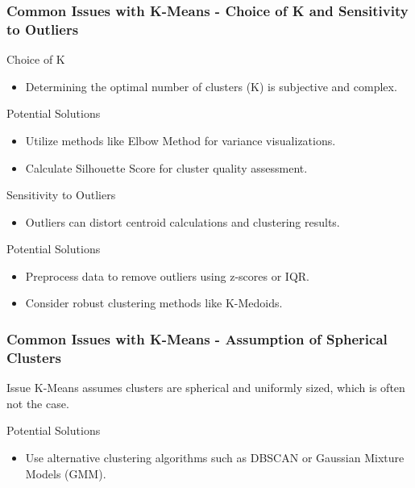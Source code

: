 \documentclass[aspectratio=169]{beamer}
\begin{document}
\begin{frame}[fragile]
    \frametitle{Common Issues with K-Means - Choice of K and Sensitivity to Outliers}
    \begin{block}{Choice of K}
        \begin{itemize}
            \item Determining the optimal number of clusters (K) is subjective and complex.
        \end{itemize}
        \begin{block}{Potential Solutions}
            \begin{itemize}
                \item Utilize methods like Elbow Method for variance visualizations.
                \item Calculate Silhouette Score for cluster quality assessment.
            \end{itemize}
        \end{block}
    \end{block}
    
    \begin{block}{Sensitivity to Outliers}
        \begin{itemize}
            \item Outliers can distort centroid calculations and clustering results.
        \end{itemize}
        \begin{block}{Potential Solutions}
            \begin{itemize}
                \item Preprocess data to remove outliers using z-scores or IQR.
                \item Consider robust clustering methods like K-Medoids.
            \end{itemize}
        \end{block}
    \end{block}
\end{frame}

\begin{frame}[fragile]
    \frametitle{Common Issues with K-Means - Assumption of Spherical Clusters}
    \begin{block}{Issue}
        K-Means assumes clusters are spherical and uniformly sized, which is often not the case.
    \end{block}
    \begin{block}{Potential Solutions}
        \begin{itemize}
            \item Use alternative clustering algorithms such as DBSCAN or Gaussian Mixture Models (GMM).
        \end{itemize}
    \end{block}
\end{frame}
\end{document}
